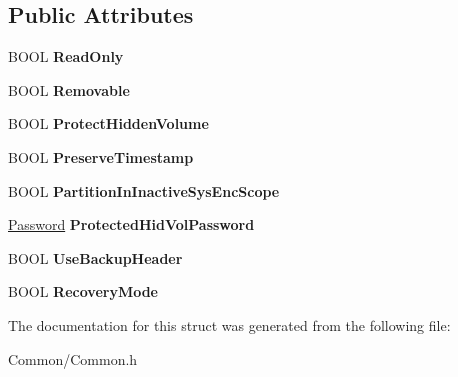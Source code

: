 \subsection*{Public Attributes}
\begin{DoxyCompactItemize}
\item 
\mbox{\label{struct_mount_options_a7b64be3b7d1de47745cc0cf16d616ea9}} 
B\+O\+OL {\bfseries Read\+Only}
\item 
\mbox{\label{struct_mount_options_aa5b3650c5e572e02ca1e18db608aede9}} 
B\+O\+OL {\bfseries Removable}
\item 
\mbox{\label{struct_mount_options_ade28ada3b92b8c1a10b7e5d1dc95051e}} 
B\+O\+OL {\bfseries Protect\+Hidden\+Volume}
\item 
\mbox{\label{struct_mount_options_a9668bd9a81f309d7df51d3ba877be843}} 
B\+O\+OL {\bfseries Preserve\+Timestamp}
\item 
\mbox{\label{struct_mount_options_a541a6c81b6789ff2667fd26f0c4794ef}} 
B\+O\+OL {\bfseries Partition\+In\+Inactive\+Sys\+Enc\+Scope}
\item 
\mbox{\label{struct_mount_options_a84cbc87f64d83c7cf79ae74bb2510d25}} 
\hyperlink{struct_password}{Password} {\bfseries Protected\+Hid\+Vol\+Password}
\item 
\mbox{\label{struct_mount_options_a61ba933b5f5b07306d6e0feb0e222c42}} 
B\+O\+OL {\bfseries Use\+Backup\+Header}
\item 
\mbox{\label{struct_mount_options_a2f903077de3d379cd9e3513e69c0ba4a}} 
B\+O\+OL {\bfseries Recovery\+Mode}
\end{DoxyCompactItemize}


The documentation for this struct was generated from the following file\+:\begin{DoxyCompactItemize}
\item 
Common/Common.\+h\end{DoxyCompactItemize}
